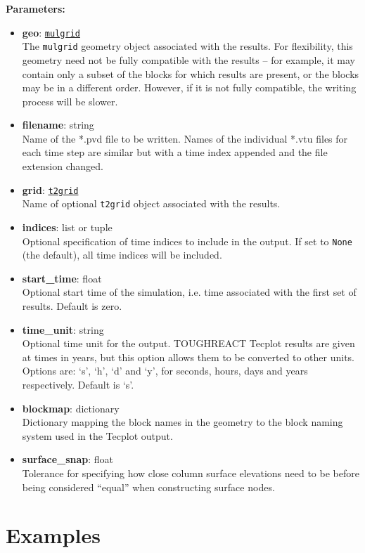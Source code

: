 \textbf{Parameters:}
\begin{itemize}
\item \textbf{geo}: \hyperref[mulgrids]{\texttt{mulgrid}}\\
  The \texttt{mulgrid} geometry object associated with the results.  For flexibility, this geometry need not be fully compatible with the results -- for example, it may contain only a subset of the blocks for which results are present, or the blocks may be in a different order.  However, if it is not fully compatible, the writing process will be slower.
\item \textbf{filename}: string\\
  Name of the *.pvd file to be written.  Names of the individual *.vtu files for each time step are similar but with a time index appended and the file extension changed.
\item \textbf{grid}: \hyperref[t2grids]{\texttt{t2grid}}\\
  Name of optional \texttt{t2grid} object associated with the results.
\item \textbf{indices}: list or tuple\\
  Optional specification of time indices to include in the output.  If set to \texttt{None} (the default), all time indices will be included.
\item \textbf{start\_time}: float\\
  Optional start time of the simulation, i.e. time associated with the first set of results.  Default is zero.
\item \textbf{time\_unit}: string\\
  Optional time unit for the output.  TOUGHREACT Tecplot results are given at times in years, but this option allows them to be converted to other units.  Options are: `s', `h', `d' and `y', for seconds, hours, days and years respectively.  Default is `s'.
\item \textbf{blockmap}: dictionary\\
  Dictionary mapping the block names in the geometry to the block naming system used in the Tecplot output.
\item \textbf{surface\_snap}: float\\
  Tolerance for specifying how close column surface elevations need to be before being considered ``equal'' when constructing surface nodes.
\end{itemize}

\section{Examples}

